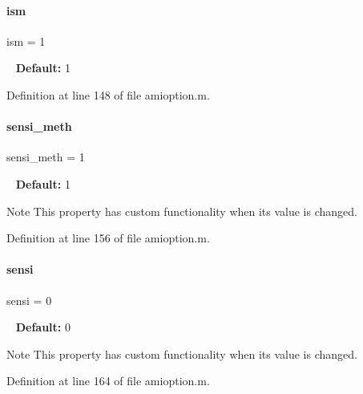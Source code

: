\mbox{\label{classamioption_aada9d6834569ad5c542cb8dc6b26ea46}} 
\paragraph{\texorpdfstring{ism}{ism}}
{\footnotesize\ttfamily ism = 1}

~\newline
{\bfseries{Default\+:}} 1 

Definition at line 148 of file amioption.\+m.

\mbox{\label{classamioption_ab31e219eb42bc06629c3f247a01b9906}} 
\paragraph{\texorpdfstring{sensi\_meth}{sensi\_meth}}
{\footnotesize\ttfamily sensi\+\_\+meth = 1}

~\newline
{\bfseries{Default\+:}} 1

\begin{DoxyNote}{Note}
This property has custom functionality when its value is changed. 
\end{DoxyNote}


Definition at line 156 of file amioption.\+m.

\mbox{\label{classamioption_a7dd31d33463c5a709251bcef0eccaa36}} 
\paragraph{\texorpdfstring{sensi}{sensi}}
{\footnotesize\ttfamily sensi = 0}

~\newline
{\bfseries{Default\+:}} 0

\begin{DoxyNote}{Note}
This property has custom functionality when its value is changed. 
\end{DoxyNote}


Definition at line 164 of file amioption.\+m.

\mbox{\label{classamioption_a85519d27e7231ac625e5b2deee92165a}} 
